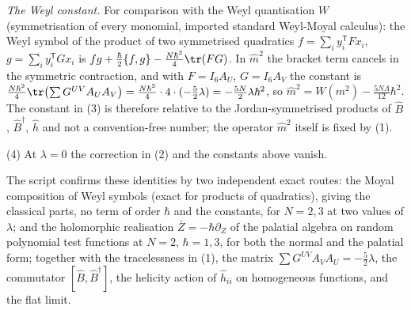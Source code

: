 \emph{The Weyl constant.} For comparison with the Weyl quantisation $W$ (symmetrisation of every monomial, imported standard Weyl-Moyal calculus): the Weyl symbol of the product of two symmetrised quadratics $f = \sum_{i}y_{i}^{\mathsf T}Fx_{i}$, $g = \sum_{i}y_{i}^{\mathsf T}Gx_{i}$ is $fg + \tfrac{\hbar}{2}\{f, g\} - \tfrac{N\hbar^{2}}{4}\tr(FG)$. In $\hat{m}^{2}$ the bracket term cancels in the symmetric contraction, and with $F = I_{6} A_{U}$, $G = I_{6} A_{V}$ the constant is $\tfrac{N\hbar^{2}}{4}\tr\bigl(\sum G^{UV}A_{U}A_{V}\bigr) = \tfrac{N\hbar^{2}}{4}\cdot 4\cdot(-\tfrac52\lambda) = -\tfrac{5N}{2}\lambda\hbar^{2}$, so $\hat{m}^{2} = W(m^{2}) - \tfrac{5N\Lambda}{12}\hbar^{2}$. The constant in (3) is therefore relative to the Jordan-symmetrised products of $\hat{B}$, $\hat{B}^{\dagger}$, $\hat{h}$ and not a convention-free number; the operator $\hat{m}^{2}$ itself is fixed by (1).

(4) At $\lambda = 0$ the correction in (2) and the constants above vanish.

The script confirms these identities by two independent exact routes: the Moyal composition of Weyl symbols (exact for products of quadratics), giving the classical parts, no term of order $\hbar$ and the constants, for $N = 2, 3$ at two values of $\lambda$; and the holomorphic realisation $\bar{Z} = -\hbar\partial_{Z}$ of the palatial algebra on random polynomial test functions at $N = 2$, $\hbar = 1, 3$, for both the normal and the palatial form; together with the tracelessness in (1), the matrix $\sum G^{UV}A_{V}A_{U} = -\tfrac52\lambda$, the commutator $[\hat{B}, \hat{B}^{\dagger}]$, the helicity action of $\hat{h}_{ii}$ on homogeneous functions, and the flat limit.
